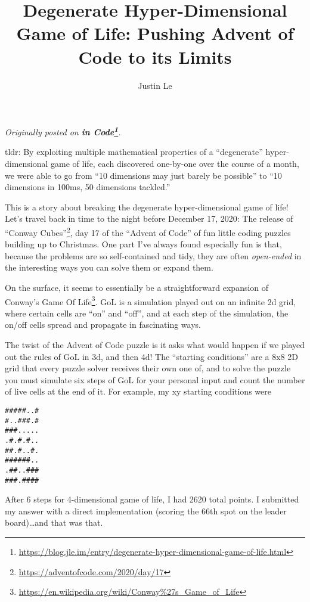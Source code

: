 \documentclass[]{article}
\title{Degenerate Hyper-Dimensional Game of Life: Pushing Advent of Code to its Limits}
\author{Justin Le}
\renewcommand{\href}[2]{#2\footnote{\url{#1}}}
\begin{document}
\maketitle

\emph{Originally posted on
\textbf{\href{https://blog.jle.im/entry/degenerate-hyper-dimensional-game-of-life.html}{in
Code}}.}

tldr: By exploiting multiple mathematical properties of a ``degenerate''
hyper-dimensional game of life, each discovered one-by-one over the course of a
month, we were able to go from ``10 dimensions may just barely be possible'' to
``10 dimensions in 100ms, 50 dimensions tackled.''

This is a story about breaking the degenerate hyper-dimensional game of life!
Let's travel back in time to the night before December 17, 2020: The release of
\href{https://adventofcode.com/2020/day/17}{``Conway Cubes''}, day 17 of the
``Advent of Code'' of fun little coding puzzles building up to Christmas. One
part I've always found especially fun is that, because the problems are so
self-contained and tidy, they are often \emph{open-ended} in the interesting
ways you can solve them or expand them.

On the surface, it seems to essentially be a straightforward expansion of
\href{https://en.wikipedia.org/wiki/Conway\%27s_Game_of_Life}{Conway's Game Of
Life}. GoL is a simulation played out on an infinite 2d grid, where certain
cells are ``on'' and ``off'', and at each step of the simulation, the on/off
cells spread and propagate in fascinating ways.

The twist of the Advent of Code puzzle is it asks what would happen if we played
out the rules of GoL in 3d, and then 4d! The ``starting conditions'' are a 8x8
2D grid that every puzzle solver receives their own one of, and to solve the
puzzle you must simulate six steps of GoL for your personal input and count the
number of live cells at the end of it. For example, my xy starting conditions
were

\begin{verbatim}
#####..#
#..###.#
###.....
.#.#.#..
##.#..#.
######..
.##..###
###.####
\end{verbatim}

After 6 steps for 4-dimensional game of life, I had 2620 total points. I
submitted my answer with a direct implementation (scoring the 66th spot on the
leader board)\ldots and that was that.
\end{document}
